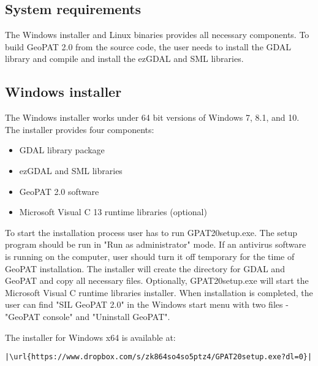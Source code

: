 \subsection{System requirements}

The Windows installer and Linux binaries provides all necessary components. 
To build GeoPAT 2.0 from the source code, the user needs to install the GDAL library and compile and install the ezGDAL and SML libraries.

\subsection{Windows installer}
The Windows installer works under 64 bit versions of Windows 7, 8.1, and 10.
The installer provides four components:
\begin{itemize}
  \item{GDAL library package}
  \item{ezGDAL and SML libraries}
  \item{GeoPAT 2.0 software}
  \item{Microsoft Visual C 13 runtime libraries (optional)}
\end{itemize}
To start the installation process user has to run GPAT20setup.exe.
The setup program should be run in "Run as administrator" mode.
If an antivirus software is running on the computer, user should turn it off temporary for the time of GeoPAT installation.
The installer will create the directory for GDAL and GeoPAT and copy all necessary files.
Optionally, GPAT20setup.exe will start the Microsoft Visual C runtime libraries installer.
When installation is completed, the user can find "SIL GeoPAT 2.0" in the Windows start menu with two files - "GeoPAT console" and "Uninstall GeoPAT".

The installer for Windows x64 is available at:

\begin{lstlisting}[escapechar=|]
|\url{https://www.dropbox.com/s/zk864so4so5ptz4/GPAT20setup.exe?dl=0}|
\end{lstlisting}

